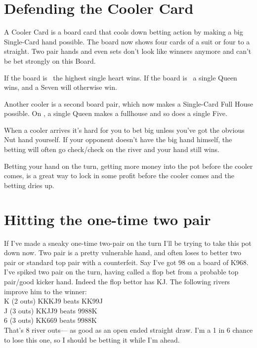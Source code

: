 \section{Defending the Cooler Card}

A Cooler Card is a board card that cools down betting action by making
a big Single-Card hand possible. The board now shows
four cards of a suit or four to a straight.
Two pair hands and even sets don't look like winners
anymore and can't be bet strongly on this Board.

If the board is \tenh\nineh\sixh\trec\fourh\, the highest single heart wins.
If the board is \Jc\tens\nineh\tred\eigc\, a single Queen wins,
and a Seven will otherwise win.

Another cooler is a second board pair, which now makes a Single-Card
Full House possible. On \Qc\fived\fiveh\fourh\Qh, a single Queen makes a
fullhouse and so does a single Five.

When a cooler arrives it's hard for you to bet big unless you've got
the obvious Nut hand yourself. If your opponent doesn't have the big
hand himself, the betting will often go check/check on the river
and your hand still wins.

Betting your hand on the turn, getting more money into the pot before
the cooler comes, is a great way to lock in some profit before the
cooler comes and the betting dries up.

\section{Hitting the one-time two pair}

If I've made a sneaky one-time two-pair on the turn I'll be trying to
take this pot down now. Two pair is a pretty vulnerable hand, and
often loses to better two pair or standard top pair with a counterfeit.
Say I've got 98 on a board of K968.  I've spiked two pair on the turn,
having called a flop bet from a probable top pair/good kicker hand.
Indeed the flop bettor has KJ. The following rivers improve him to the
winner: \\
K (2 outs) KKKJ9 beats KK99J \\
J (3 outs) KKJJ9 beats 9988K \\
6 (3 outs) KK669 beats 9988K \\

That's 8 river outs--- as good as an open ended straight draw. I'm a 1 in 6
chance to lose this one, so I should be betting it while I'm ahead.

